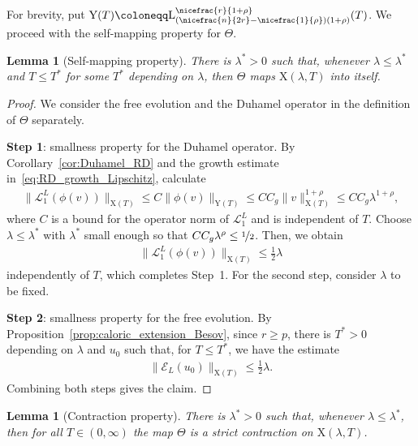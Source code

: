 \documentclass[11pt, leqno]{amsart}
\newtheorem{lemma}[theorem]{Lemma}
\theoremstyle{definition}
\renewcommand{\L}{\mathrm{L}}
\newcommand{\X}{\mathrm{X}}
\newcommand{\Y}{\mathrm{Y}}
\newcommand{\Ext}{\mathcal{E}}
\newcommand{\Soll}{\mathcal{L}}
\begin{document}
	For brevity, put $\Y(T)\coloneqq \L^{\nicefrac{r}{1+\rho}}_{(\nicefrac{n}{2r} - \nicefrac{1}{\rho})(1 + \rho)}(T)$. We proceed with the self-mapping property for $\Theta$.

	\begin{lemma}[Self-mapping property]
		There is $\lambda^* > 0$ such that, whenever $\lambda \leq \lambda^*$ and $T \leq T^*$ for some $T^*$ depending on $\lambda$, then $\Theta$ maps $\X(\lambda,T)$ into itself.
	\end{lemma}

	\begin{proof}
		We consider the free evolution and the Duhamel operator in the definition of $\Theta$ separately.

		\textbf{Step 1}: smallness property for the Duhamel operator. By Corollary~\ref{cor:Duhamel_RD} and the growth estimate in~\eqref{eq:RD_growth_Lipschitz}, calculate
		\begin{align}
			\| \Soll^L_1(\phi(v)) \|_{\X(T)} \leq C \| \phi(v) \|_{\Y(T)} \leq C C_g \| v \|_{\X(T)}^{1+\rho} \leq C C_g \lambda^{1+\rho},
		\end{align}
		where $C$ is a bound for the operator norm of $\Soll^L_1$ and is independent of $T$. Choose $\lambda \leq \lambda^*$ with $\lambda^*$ small enough so that $CC_g \lambda^\rho \leq \nicefrac{1}{2}$. Then, we obtain
		\begin{align}
			\| \Soll^L_1(\phi(v)) \|_{\X(T)} \leq \frac{1}{2} \lambda
		\end{align}
		independently of $T$, which completes Step~1. For the second step, consider $\lambda$ to be fixed.

		\textbf{Step 2}: smallness property for the free evolution. By Proposition~\ref{prop:caloric_extension_Besov}, since $r \geq p$, there is $T^* > 0$ depending on $\lambda$ and $u_0$ such that, for $T \leq T^*$, we have the estimate
		\begin{align}
			\| \Ext_L(u_0) \|_{\X(T)} \leq \frac{1}{2} \lambda.
		\end{align}
		Combining both steps gives the claim.
	\end{proof}

	\begin{lemma}[Contraction property]
		\label{lem:rd_contraction}
		There is $\lambda^* > 0$ such that, whenever $\lambda \leq \lambda^*$, then for all $T\in { (0,\infty)}$ the map $\Theta$ is a strict contraction on $\X(\lambda, T)$.
	\end{lemma}
\end{document}
